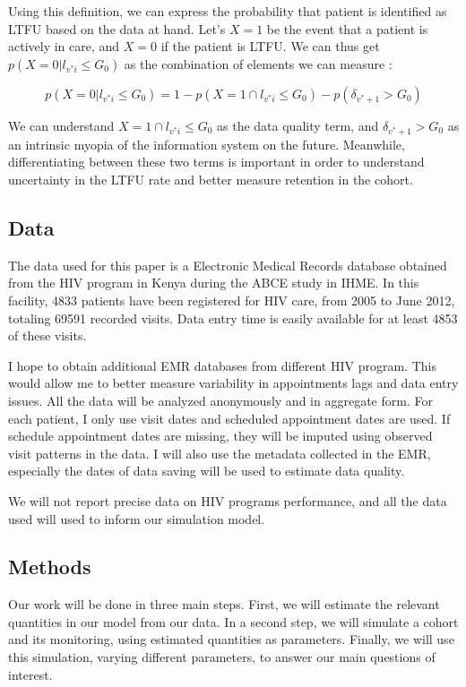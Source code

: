 Using this definition, we can express the probability that patient is identified as LTFU based on the data at hand. Let's $X = 1$ be the event that a patient is actively in care, and $X = 0$ if the patient is LTFU. We can thus get $p(X = 0 | l_{v^{*}i} \leq  G_0)$ as the combination of elements we can measure :

$$p(X = 0 | l_{v^{*}i} \leq  G_0) = 1 - p(X = 1  \cap l_{v^{*}i} \leq  G_0) - p(\delta_{v^*+1} > G_0) $$

We can understand $X = 1  \cap l_{v^{*}i} \leq  G_0$ as the data quality term, and $\delta_{v^*+1} > G_0$ as an intrinsic myopia of the information system on the future. Meanwhile, differentiating between these two terms is  important in order to understand uncertainty in the LTFU rate and better measure retention in the cohort.

\subsection{Data}

The data used for this paper is a Electronic Medical Records database obtained from the HIV program in Kenya during the ABCE study in IHME. In this facility, 4833 patients have been registered for HIV care, from 2005 to June 2012, totaling 69591 recorded visits. Data entry time is easily available for at least 4853 of these visits.

I hope to obtain additional EMR databases from different HIV program. This would allow me to better measure variability in appointments lags and data entry issues. All the data will be analyzed anonymously and in aggregate form. For each patient, I only use visit dates and scheduled appointment dates are used. If schedule appointment dates are missing, they will be imputed using observed visit patterns in the data. I will also use the metadata collected in the EMR, especially the dates of data saving will be used to estimate data quality.

We will not report precise data on HIV programs performance, and all the data used will used to inform our simulation model.

\subsection{Methods}

Our work will be done in three main steps. First, we will estimate the relevant quantities in our model from our data. In a second step, we will simulate a cohort and its monitoring, using estimated quantities as parameters. Finally, we will use this simulation, varying different parameters, to answer our main questions of interest.

